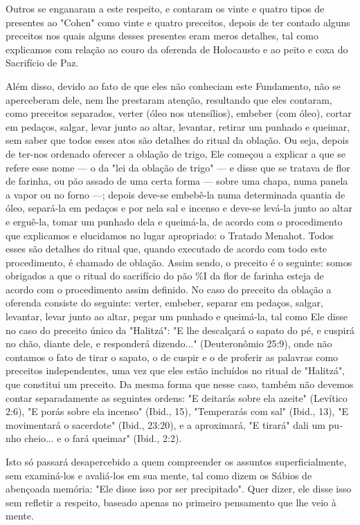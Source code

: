 \begin{itemize}
\begin{enumrate}
\begin{itemize}
Outros se enganaram a este respeito, e contaram os vinte e quatro tipos
de presentes ao "Cohen" como vinte e quatro preceitos, depois de ter
contado alguns preceitos nos quais alguns desses presentes eram meros
deta­lhes, tal como explicamos com relação ao couro da oferenda de
Holocausto e ao peito e coxa do Sacrifício de Paz.

Além disso, devido ao fato de que eles não conheciam este Funda­mento,
não se aperceberam dele, nem lhe prestaram atenção, resultando que eles
contaram, como preceitos separados, verter (óleo nos utensílios),
embe­ber (com óleo), cortar em pedaços, salgar, levar junto ao altar,
levantar, retirar um punhado e queimar, sem saber que todos esses atos
são detalhes do ritual da oblação. Ou seja, depois de ter-nos ordenado
oferecer a oblação de trigo, Ele começou a explicar a que se refere esse
nome --- o da "lei da oblação de trigo" --- e disse que se tratava de
flor de farinha, ou pão assado de uma certa forma --- sobre uma chapa,
numa panela a vapor ou no forno ---; depois de­ve-se embebê-la numa
determinada quantia de óleo, separá-la em pedaços e por nela sal e
incenso e deve-se levá-la junto ao altar e erguê-la, tomar um punhado
dela e queimá-la, de acordo com o procedimento que explicamos e
elucidamos no lugar apropriado: o Tratado Menahot. Todos esses são
detalhes do ritual que, quando executado de acordo com todo este
procedimento, é chamado de obla­ção. Assim sendo, o preceito é o
seguinte: somos obrigados a que o ritual do sacrifício do pão \%I da
flor de farinha esteja de acordo com o procedimento assim definido. No
caso do preceito da oblação a oferenda consiste do seguin­te: verter,
embeber, separar em pedaços, salgar, levantar, levar junto ao altar,
pegar um punhado e queimá-la, tal como Ele disse no caso do preceito
único da "Halitzá": "E lhe descalçará o sapato do pé, e cuspirá no chão,
diante dele, e responderá dizendo..." (Deuteronômio 25:9), onde não
contamos o fato de tirar o sapato, o de cuspir e o de proferir as
palavras como preceitos indepen­dentes, uma vez que eles estão incluídos
no ritual de "Halitzá", que constitui um preceito. Da mesma forma que
nesse caso, também não devemos contar separadamente as seguintes ordens:
"E deitarás sobre ela azeite" (Levítico 2:6), "E porás sobre ela
incenso" (Ibid., 15), "Temperarás com sal" (Ibid., 13), "E
movimentará o sacerdote" (Ibid., 23:20), e a aproximará, "E tirará" dali
um pu­nho cheio... e o fará queimar" (Ibid., 2:2).

Isto só passará desapercebido a quem compreender os assuntos
su­perficialmente, sem examiná-los e avaliá-los em sua mente, tal como
dizem os Sábios de abençoada memória: "Ele disse isso por ser
precipitado". Quer di­zer, ele disse isso sem refletir a respeito,
baseado apenas no primeiro pensa­mento que lhe veio à mente.


\end{itemize}
\end{enumrate}
\end{itemize}
